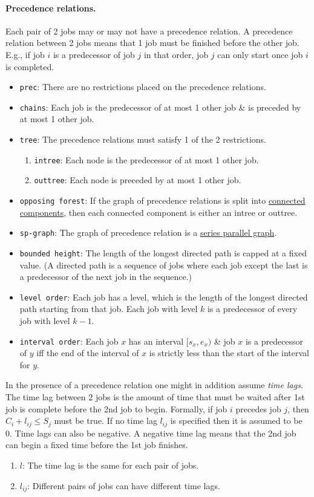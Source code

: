 \documentclass{article}
\begin{document}
\paragraph{Precedence relations.} Each pair of 2 jobs may or may not have a precedence relation. A precedence relation between 2 jobs means that 1 job must be finished before the other job. E.g., if job $i$ is a predecessor of job $j$ in that order, job $j$ can only start once job $i$ is completed.
\begin{itemize}
	\item {\tt prec}: There are no restrictions placed on the precedence relations.
	\item {\tt chains}: Each job is the predecessor of at most 1 other job \& is preceded by at most 1 other job.
	\item {\tt tree}: The precedence relations must satisfy 1 of the 2 restrictions.
	\begin{enumerate}
		\item {\tt intree}: Each node is the predecessor of at most 1 other job.
		\item {\tt outtree}: Each node is preceded by at most 1 other job.
	\end{enumerate}
	\item {\tt opposing forest}: If the graph of precedence relations is split into \href{https://en.wikipedia.org/wiki/Component_(graph_theory)}{connected components}, then each connected component is either an intree or outtree.
	\item {\tt sp-graph}: The graph of precedence relation is a \href{https://en.wikipedia.org/wiki/Series%E2%80%93parallel_graph}{series parallel graph}.
	\item {\tt bounded height}: The length of the longest directed path is capped at a fixed value. (A directed path is a sequence of jobs where each job except the last is a predecessor of the next job in the sequence.)
	\item {\tt level order}: Each job has a level, which is the length of the longest directed path starting from that job. Each job with level $k$ is a predecessor of every job with level $k - 1$.
	\item {\tt interval order}: Each job $x$ has an interval $[s_x,e_x)$ \& job $x$ is a predecessor of $y$ iff the end of the interval of $x$ is strictly less than the start of the interval for $y$.
\end{itemize}
In the presence of a precedence relation one might in addition assume {\it time lags}. The time lag between 2 jobs is the amount of time that must be waited after 1st job is complete before the 2nd job to begin. Formally, if job $i$ precedes job $j$, then $C_i + l_{ij}\le S_j$ must be true. If no time lag $l_{ij}$ is specified then it is assumed to be 0. Time lags can also be negative. A negative time lag means that the 2nd job can begin a fixed time before the 1st job finishes.
\begin{enumerate}
	\item $l$: The time lag is the same for each pair of jobs.
	\item $l_{ij}$: Different pairs of jobs can have different time lags.
\end{enumerate}
\end{document}
